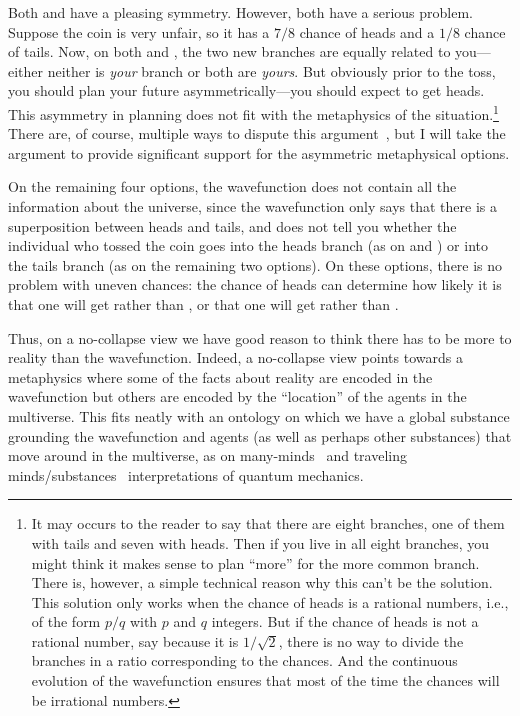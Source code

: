 Both  and  have a pleasing symmetry. However, both have a serious problem.
Suppose the coin is very unfair, so it has a $7/8$ chance of heads and a $1/8$ chance of tails. Now, on both 
 and , the two new branches are equally related to you---either neither is 
\textit{your} branch or both are \textit{yours}. But obviously prior to the toss, you should plan your future 
asymmetrically---you should expect to get heads. This asymmetry in planning does not fit with the metaphysics 
of the situation.\footnote{It may occurs to the reader to say that there are eight branches, one of them with 
tails and seven with heads. Then if you live in all eight branches, you might think it makes sense to plan 
``more'' for the more common branch. There is, however, a simple technical reason why this can't be the solution.
This solution only works when the chance of heads is a rational numbers, i.e., of the form $p/q$ with $p$ and $q$ integers.
But if the chance of heads is not a rational number, say because it is $1/\sqrt{2}$, there is no way to divide 
the branches in a ratio corresponding to the chances. And the continuous evolution of the wavefunction ensures
that most of the time the chances will be irrational numbers.} There are, of course, multiple ways to dispute this argument~\parencite{Vaidman,DeutschProbab,WallaceEverett}, but I will take the argument to provide significant support for the asymmetric metaphysical options. 

On the remaining four options, the wavefunction does not contain all the information about the universe, since the wavefunction
only says that there is a superposition between heads and tails, and does not tell you whether the individual who tossed
the coin goes into the heads branch (as on  and ) or into the tails branch (as on
the remaining two options). On these options, there is no problem with uneven chances: the chance of heads can determine 
how likely it is that one will get  rather than , or that one will get 
 rather than .

Thus, on a no-collapse view we have good reason to think there has to be more to reality 
than the wavefunction. Indeed, a no-collapse view points towards a metaphysics where some of the facts about 
reality are encoded in the wavefunction but others are encoded by the ``location'' of the agents in the multiverse.
This fits neatly with an ontology on which we have a global substance grounding the wavefunction and agents (as
well as perhaps other substances) that move around in the multiverse, as on many-minds~\parencite{AlbertLoewer} and traveling minds/substances~\parencite{BarrettSingle,PrussTraveling} interpretations of quantum mechanics.

